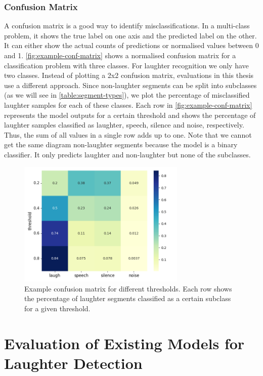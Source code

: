\documentclass[bsc,frontabs,parskip,deptreport]{infthesis}
\begin{document}
\subsection{Confusion Matrix} \label{sec:conf-matrix}
A confusion matrix is a good way to identify misclassifications. In a multi-class problem, it shows the true label on one axis and the predicted label on the other. It can either show the actual counts of predictions or normalised values between 0 and 1. \autoref{fig:example-conf-matrix} shows a normalised confusion matrix for a classification problem with three classes.
For laughter recognition we only have two classes. Instead of plotting a 2x2 confusion matrix, evaluations in this thesis use a different approach.
Since non-laughter segments can be split into subclasses (as we will see in \autoref{table:segment-types}), we plot the percentage of misclassified laughter samples for each of these classes. 
Each row in \autoref{fig:example-conf-matrix} represents the model outputs for a certain threshold and shows the percentage of laughter samples classified as laughter, speech, silence and noise, respectively. Thus, the sum of all values in a single row adds up to one. 
Note that we cannot get the same diagram non-laughter segments because the model is a binary classifier. It only predicts laughter and non-laughter but none of the subclasses. 

\begin{figure}[h!]
    \centering
    \includegraphics[width=8cm]{imgs/conf_matrix/init_eval_all.png}
    \caption{Example confusion matrix for different thresholds. Each row shows the percentage of laughter segments classified as a certain subclass for a given threshold.}
    \label{fig:example-conf-matrix}
\end{figure}

\chapter{Evaluation of Existing Models for Laughter Detection} \label{cha:model-evaluation}
\end{document}
